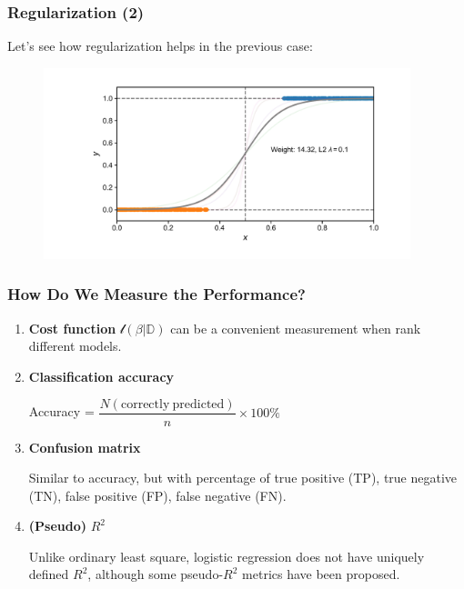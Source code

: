 \documentclass[10pt,aspectratio=169]{beamer}
\begin{document}
      \begin{frame}
        \frametitle{Regularization (2)}
        Let's see how regularization helps in the previous case:

        \begin{figure}[t]
          \includegraphics[width=0.95\textwidth]{scripts/perfect_sep_reg.pdf}
        \end{figure}
      \end{frame}

      \begin{frame}
        \frametitle{How Do We Measure the Performance?}
        \begin{enumerate}
          \vfill \item \textbf{Cost function}
          $\mathscr{l}(\beta | \mathbb{D})$ can be a convenient
          measurement when rank different models.
          
          \vfill \item \textbf{Classification accuracy}
          
          Accuracy =
          $\dfrac{N(\mathrm{correctly\ predicted})}{n} \times 100\%$
          
          \vfill \item \textbf{Confusion matrix}

          Similar to accuracy, but with percentage of true positive
          (TP), true negative (TN), false positive (FP), false
          negative (FN).
          
          \vfill \item \textbf{(Pseudo)} $R^{2}$

          Unlike ordinary least square, logistic regression does not
          have uniquely defined $R^{2}$, although some pseudo-$R^{2}$
          metrics have been proposed.
        \end{enumerate}
        
      \end{frame}
\end{document}
